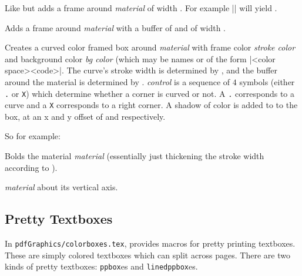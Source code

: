Like \gotomacro{} but adds a frame around {\it material} of width \macro\framewidth.
For example \inlinecode|| will yield .
\emacroexp

Adds a frame around {\it material} with a buffer of \macro\bufferwidth{} and \macro\bufferheight{} of width \macro\framewidth.
\emacroexp

Creates a curved color framed box around {\it material} with frame color {\it stroke color} and background color {\it bg color} (which may be names or of the form \inlinecode|<color space>{<code>}|.
The curve's stroke width is determined by \macro\curvewidth, and the buffer around the material is determined by \macro\curvebuffer.
{\it control} is a sequence of $4$ symbols (either {\tt .} or {\tt X}) which determine whether a corner is curved or not.
A {\tt .} corresponds to a curve and a {\tt X} corresponds to a right corner.
A shadow of color \macro\boxshadowcolor{} is added to to the box, at an x and y offset of \macro\shadowxoff{} and \macro\shadowyoff{} respectively.

So for example:

\emacroexp

Bolds the material {\it material} (essentially just thickening the stroke width according to \macro\fakeboldwidth).
\emacroexp

\quitvmode{} {\it material} about its vertical axis.
\emacroexp

\subsection{Pretty Textboxes}

In {\tt pdfGraphics/colorboxes.tex}, \pdftoolbox{} provides macros for pretty printing textboxes.
These are simply colored textboxes which can split across pages.
There are two kinds of pretty textboxes: {\tt ppbox}es and {\tt linedppbox}es.

